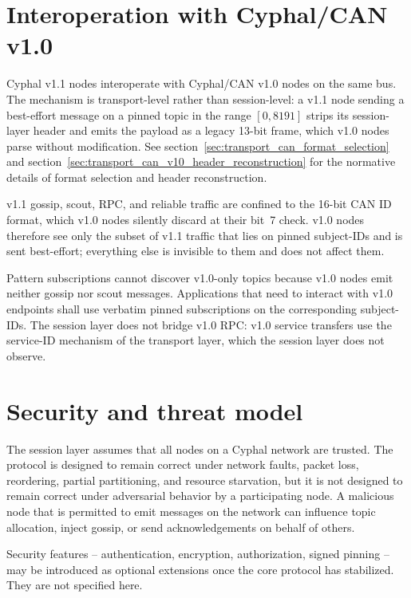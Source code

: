 






\section{Interoperation with Cyphal/CAN v1.0}\label{sec:session_v10_interop}

Cyphal v1.1 nodes interoperate with Cyphal/CAN v1.0 nodes on the same bus.
The mechanism is transport-level rather than session-level: a v1.1 node sending a
best-effort message on a pinned topic in the range $[0, 8191]$ strips its
session-layer header and emits the payload as a legacy 13-bit frame, which v1.0 nodes
parse without modification.
See section~\ref{sec:transport_can_format_selection} and
section~\ref{sec:transport_can_v10_header_reconstruction} for the normative details of
format selection and header reconstruction.

v1.1 gossip, scout, RPC, and reliable traffic are confined to the 16-bit CAN ID format,
which v1.0 nodes silently discard at their bit~7 check.
v1.0 nodes therefore see only the subset of v1.1 traffic that lies on pinned subject-IDs
and is sent best-effort; everything else is invisible to them and does not affect them.

Pattern subscriptions cannot discover v1.0-only topics because v1.0 nodes emit neither
gossip nor scout messages. Applications that need to interact with v1.0 endpoints
shall use verbatim pinned subscriptions on the corresponding subject-IDs.
The session layer does not bridge v1.0 RPC: v1.0 service transfers use the
service-ID mechanism of the transport layer, which the session layer does not observe.

\section{Security and threat model}\label{sec:session_security}

The session layer assumes that all nodes on a Cyphal network are trusted.
The protocol is designed to remain correct under network faults, packet loss,
reordering, partial partitioning, and resource starvation, but it is not designed to
remain correct under adversarial behavior by a participating node.
A malicious node that is permitted to emit messages on the network can influence
topic allocation, inject gossip, or send acknowledgements on behalf of others.

Security features -- authentication, encryption, authorization, signed pinning -- may
be introduced as optional extensions once the core protocol has stabilized.
They are not specified here.
